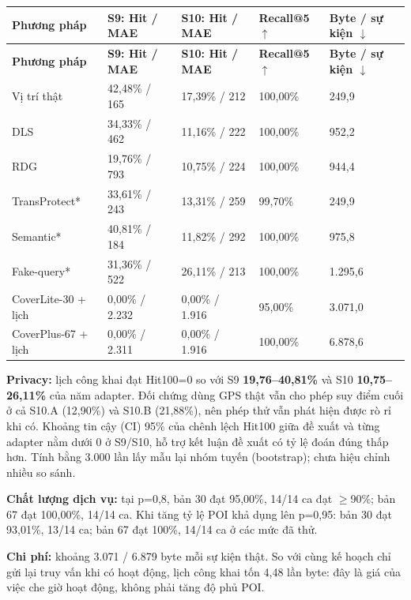 \documentclass[10pt,a4paper]{article}
\begin{document}
\begingroup\small
\begin{longtable}{@{}P{3.177cm}P{3.658cm}P{3.658cm}P{2.695cm}P{2.888cm}@{}}
\toprule
\textbf{Phương pháp} & \textbf{S9: Hit / MAE} & \textbf{S10: Hit / MAE} & \textbf{Recall@5 $\uparrow$} & \textbf{Byte / sự kiện $\downarrow$}\\\midrule
\endfirsthead
\toprule
\textbf{Phương pháp} & \textbf{S9: Hit / MAE} & \textbf{S10: Hit / MAE} & \textbf{Recall@5 $\uparrow$} & \textbf{Byte / sự kiện $\downarrow$}\\\midrule
\endhead
\bottomrule\endfoot
Vị trí thật & 42,48\% / 165 & 17,39\% / 212 & 100,00\% & 249,9\\
\addlinespace[3pt]
DLS & 34,33\% / 462 & 11,16\% / 222 & 100,00\% & 952,2\\
\addlinespace[3pt]
RDG & 19,76\% / 793 & 10,75\% / 224 & 100,00\% & 944,4\\
\addlinespace[3pt]
TransProtect* & 33,61\% / 243 & 13,31\% / 259 & 99,70\% & 249,9\\
\addlinespace[3pt]
Semantic* & 40,81\% / 184 & 11,82\% / 292 & 100,00\% & 975,8\\
\addlinespace[3pt]
Fake-query* & 31,36\% / 522 & 26,11\% / 213 & 100,00\% & 1.295,6\\
\addlinespace[3pt]
CoverLite-30 + lịch & 0,00\% / 2.232 & 0,00\% / 1.916 & 95,00\% & 3.071,0\\
\addlinespace[3pt]
CoverPlus-67 + lịch & 0,00\% / 2.311 & 0,00\% / 1.916 & 100,00\% & 6.878,6\\
\end{longtable}
\endgroup
\textbf{Privacy:} lịch công khai đạt Hit100=0 so với S9 \textbf{19,76–40,81\%} và S10 \textbf{10,75–26,11\%} của năm adapter. Đối chứng dùng GPS thật vẫn cho phép suy điểm cuối ở cả S10.A (12,90\%) và S10.B (21,88\%), nên phép thử vẫn phát hiện được rò rỉ khi có. Khoảng tin cậy (CI) 95\% của chênh lệch Hit100 giữa đề xuất và từng adapter nằm dưới 0 ở S9/S10, hỗ trợ kết luận đề xuất có tỷ lệ đoán đúng thấp hơn. Tính bằng 3.000 lần lấy mẫu lại nhóm tuyến (bootstrap); chưa hiệu chỉnh nhiều so sánh.

\textbf{Chất lượng dịch vụ:} tại p=0,8, bản 30 đạt 95,00\%, 14/14 ca đạt $\ge$90\%; bản 67 đạt 100,00\%, 14/14 ca. Khi tăng tỷ lệ POI khả dụng lên p=0,95: bản 30 đạt 93,01\%, 13/14 ca; bản 67 đạt 100\%, 14/14 ca ở các mức đã thử.

\textbf{Chi phí:} khoảng 3.071 / 6.879 byte mỗi sự kiện thật. So với cùng kế hoạch chỉ gửi lại truy vấn khi có hoạt động, lịch công khai tốn 4,48 lần byte: đây là giá của việc che giờ hoạt động, không phải tăng độ phủ POI.
\end{document}
